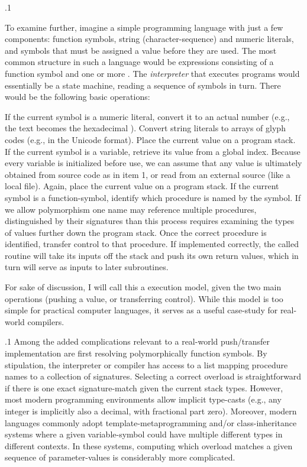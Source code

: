 \documentclass[11pt, twocolumn]{article}
\begin{document}
\p.1{%
To examine further, imagine a simple programming language with
just a few components: function symbols, string (character-sequence)
and numeric literals, and 
symbols that must be assigned a value before they are used.
The most common structure in such a language would be expressions consisting of a function
symbol and one or more .  The \textit{interpreter}
that executes programs would essentially
be a state machine, reading a sequence of symbols
in turn.  There would be the following basic operations:

\begin{enums}

\enumsItem{}   If the current symbol is a numeric literal, convert it to an actual number
(e.g., the text  becomes the hexadecimal \OxFO{}).  Convert
string literals to arrays of glyph
codes (e.g., in the Unicode \UTFonesix{} format).  Place the current
value on a program stack. 
\enumsItem{}   If the current symbol is a variable, retrieve
its value from a global index.  Because every
variable is initialized before use, we can assume that
any value is ultimately obtained from source code
as in item 1, or read from an external source (like a local file).
Again, place the current value on a program stack. 
\enumsItem{}   If the current symbol is a function-symbol, identify
which procedure is named by the symbol.  If we allow
polymorphism \mdash{} one name may reference multiple procedures,
distinguished by their signatures \mdash{} than this process
requires examining the types of values further down the
program stack.  Once the correct procedure is identified,
transfer control to that procedure.  If implemented
correctly, the called routine will take its inputs off the
stack and push its own return values, which in turn
will serve as inputs to later subroutines.

\end{enums}

\nip
For sake of discussion, I will call this a  execution
model, given the two main operations (pushing a value, or transferring
control).  While this model is too simple for practical computer
languages, it serves as a useful case-study for real-world
compilers.
} %

\p.1{%
Among the added complications relevant to a real-world push/transfer
implementation are \mdash{} first \mdash{} resolving polymorphically
 function symbols.  By stipulation, the interpreter or compiler
has access to a list mapping procedure names to a collection of signatures.
Selecting a correct overload is straightforward if there is one exact
signature-match given the current stack types.  However, most modern
programming environments allow implicit type-casts (e.g., any integer is implicitly also
a decimal, with fractional part zero).  Moreover, modern languages commonly
adopt template-metaprogramming and/or class-inheritance systems where
a given variable-symbol could have multiple different types in different
contexts.  In these systems, computing which overload matches a
given sequence of parameter-values is considerably more complicated.
} %
\end{document}
